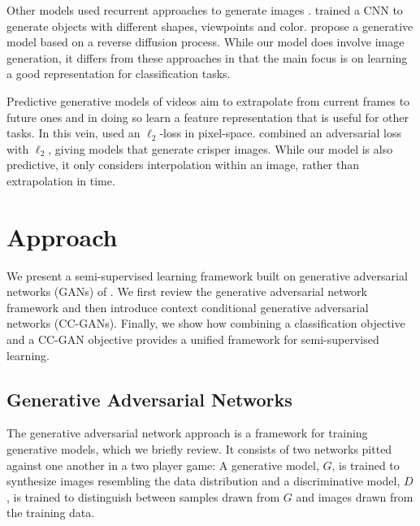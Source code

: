 \documentclass{article} %
\begin{document}
Other models used recurrent approaches to generate images
\citep{gregor2015, theis2015, mansimov2016, oord2016}.  \cite{dosovitskiy2015} trained a CNN to generate objects with
different shapes, viewpoints and color.  
\cite{sohldickstein2015} propose a generative model based on a reverse
diffusion process. While our model does involve image generation, it
differs from these approaches in that the main focus is on learning a
good representation for classification tasks.

Predictive generative models of videos aim to extrapolate from current
frames to future ones and in doing so learn a feature
representation that is useful for other tasks. In this vein, \cite{Ranzato14} used an
$\ell_2$-loss in pixel-space. \cite{Mathieu15} combined
an adversarial loss with $\ell_2$, giving models that generate crisper
images. While our model is also predictive, it only
considers interpolation within an image, rather than extrapolation in
time. 


\section{Approach}
We present a semi-supervised learning framework built on generative adversarial networks (GANs) of \cite{goodfellow2014}. 
We first review the generative adversarial network framework and then introduce context conditional generative adversarial networks (CC-GANs).
Finally, we show how combining a classification objective and a CC-GAN objective provides a unified framework for semi-supervised learning.

\subsection{Generative Adversarial Networks}
The generative adversarial network approach \citep{goodfellow2014} is a
framework for training generative models, which we briefly review.  
It consists of two networks pitted against one another in a two player game:
A generative model, $G$, is trained to synthesize images resembling the data distribution and a discriminative model, $D$, is trained to distinguish between samples drawn from $G$ and images drawn from the training data.
\end{document}
